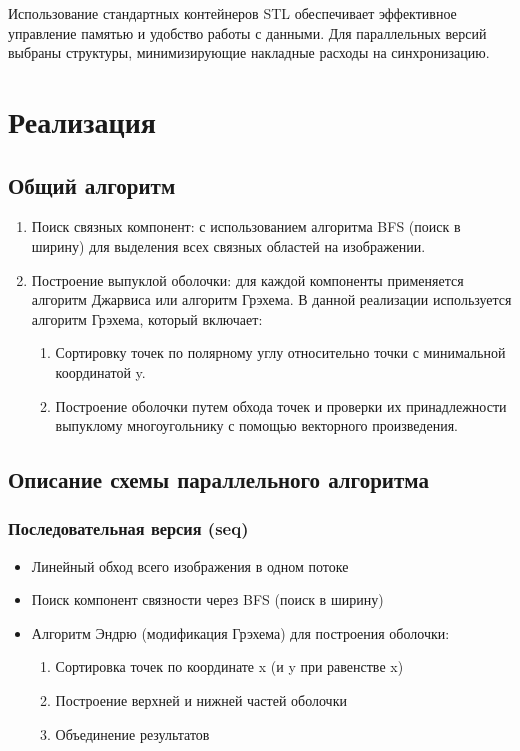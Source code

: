 \documentclass[12pt]{article}
\begin{document}
Использование стандартных контейнеров STL обеспечивает эффективное управление памятью и удобство работы с данными. Для параллельных версий выбраны структуры, минимизирующие накладные расходы на синхронизацию.

\section{Реализация}
\subsection{Общий алгоритм}
\begin{enumerate}
    \item Поиск связных компонент: с использованием алгоритма BFS (поиск в ширину) для выделения всех связных областей на изображении.
    \item Построение выпуклой оболочки: для каждой компоненты применяется алгоритм Джарвиса или алгоритм Грэхема. В данной реализации используется алгоритм Грэхема, который включает:
\begin{enumerate}
    \item Сортировку точек по полярному углу относительно точки с минимальной координатой y.
    \item Построение оболочки путем обхода точек и проверки их принадлежности выпуклому многоугольнику с помощью векторного произведения.
\end{enumerate}
\end{enumerate}

\subsection{Описание схемы параллельного алгоритма}
\subsubsection{Последовательная версия (seq)}
\begin{itemize}
    \item Линейный обход всего изображения в одном потоке
    \item Поиск компонент связности через BFS (поиск в ширину)
    \item Алгоритм Эндрю (модификация Грэхема) для построения оболочки:
    \begin{enumerate}
        \item Сортировка точек по координате x (и y при равенстве x)
        \item Построение верхней и нижней частей оболочки
        \item Объединение результатов
    \end{enumerate}
\end{itemize}
\end{document}

